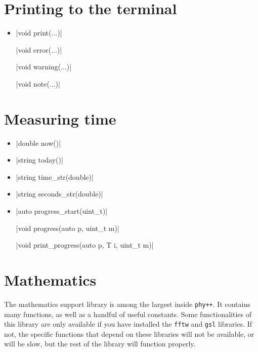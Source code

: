 \documentclass[12pt]{report}
\newcommand{\phypp}{\texttt{phy++}\xspace}
\begin{document}
\section{Printing to the terminal \label{SEC:support:print}}

\begin{itemize}

\item \cppinline|void print(...)| 

\cppinline|void error(...)| 

\cppinline|void warning(...)| 

\cppinline|void note(...)| 

\end{itemize}

\section{Measuring time \label{SEC:support:time}}

\begin{itemize}

\item \cppinline|double now()| 

\item \cppinline|string today()| 

\item \cppinline|string time_str(double)| 

\item \cppinline|string seconds_str(double)| 

\item \cppinline|auto progress_start(uint_t)| 

\cppinline|void progress(auto p, uint_t m)| 

\cppinline|void print_progress(auto p, T i, uint_t m)| 

\end{itemize}

\section{Mathematics \label{SEC:support:math}}

The mathematics support library is among the largest inside \phypp. It contains many functions, as well as a handful of useful constants. Some functionalities of this library are only available if you have installed the \texttt{fftw} and \texttt{gsl} libraries. If not, the specific functions that depend on these libraries will not be available, or will be slow, but the rest of the library will function properly.
\end{document}
